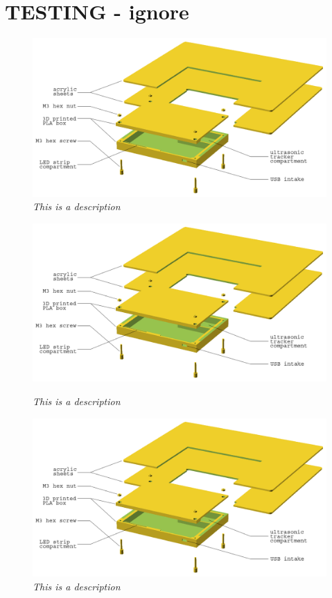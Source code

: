 \section{TESTING - ignore}

\begin{figure}[h]
\begin{center}
\includegraphics[scale=0.5]{figures/explode.png}
\caption{\small {\it {This is a description}}} \label{fig:testfig0}
\end{center}
\end{figure}


\begin{figure}[h]
\begin{minipage}[b]{7.5cm}
\centering
\includegraphics[scale=0.20]{figures/explode.png}
\caption{\small {\it {This is a description}}} \label{fig:testfig1}
\end{minipage}
\begin{minipage}[b]{7.5cm}
\centering
\includegraphics[scale=0.20]{figures/explode.png}
\caption{\small {\it {This is a description}}} \label{fig:testfig2}
\end{minipage}
\end{figure}


